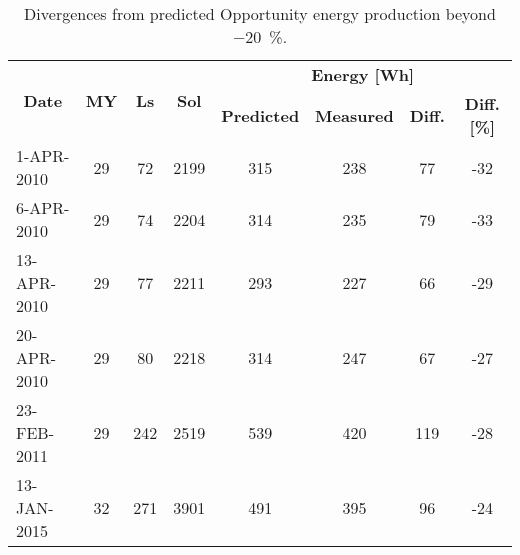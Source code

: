 \begin{table}[h]
    \footnotesize
    \centering
    \caption[Divergences from predicted Opportunity energy production beyond \SI{-20}{\percent}]
        {Divergences from predicted Opportunity energy production beyond \SI{-20}{\percent}.}
    \label{tab:divergences-less-than-m20pc}
    \begin{tabular}{|l|c|c|c|c|c|c|c|}
    \hline
    \multicolumn{1}{|c|}{\multirow{2}{*}{\textbf{Date}}} & \multirow{2}{*}{\textbf{MY}} & \multirow{2}{*}{\textbf{Ls}} & \multirow{2}{*}{\textbf{Sol}} & \multicolumn{4}{c|}{\textbf{Energy [Wh]}} \\ \cline{5-8}
    \multicolumn{1}{|c|}{} &  &  &  & \textbf{Predicted} & \textbf{Measured} & \textbf{Diff.} & \textbf{Diff. [\%]} \\ \hline
    1-APR-2010 & 29 & 72 & 2199 & 315 & 238 & 77 & -32 \\
    6-APR-2010 & 29 & 74 & 2204 & 314 & 235 & 79 & -33 \\
    13-APR-2010 & 29 & 77 & 2211 & 293 & 227 & 66 & -29 \\
    20-APR-2010 & 29 & 80 & 2218 & 314 & 247 & 67 & -27 \\ \hline
    23-FEB-2011 & 29 & 242 & 2519 & 539 & 420 & 119 & -28 \\ \hline
    13-JAN-2015 & 32 & 271 & 3901 & 491 & 395 & 96 & -24 \\ \hline
    \end{tabular}
\end{table}
